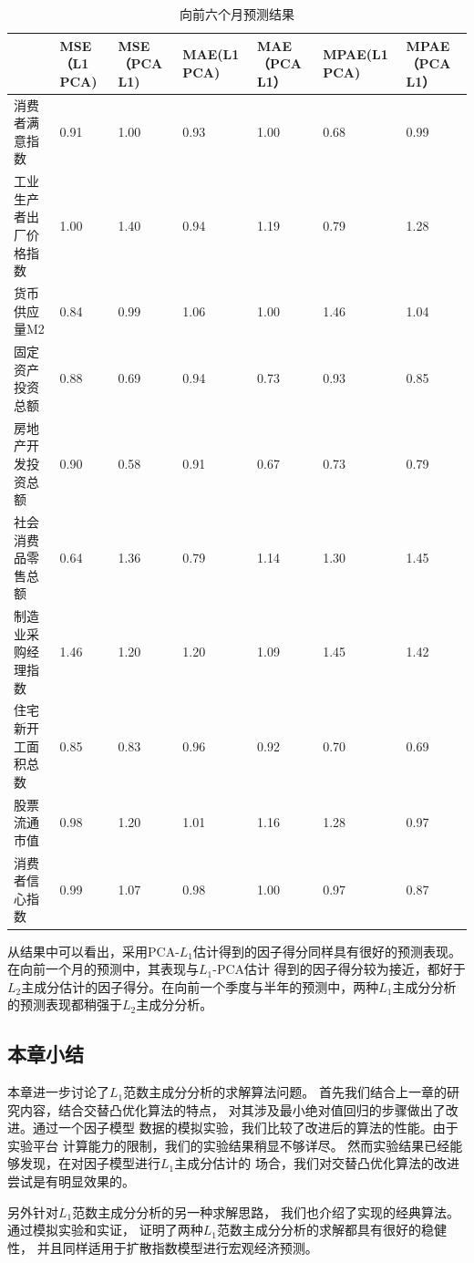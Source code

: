 \begin{table}[H]\label{outcome3}
    \centering
    \small
    \caption{向前六个月预测结果}
    \label{outcome6}
    \begin{tabularx}{\textwidth}{lXXXXXX}
    \toprule
                 &  MSE（L1 PCA) &  MSE（PCA L1) &  MAE(L1 PCA) &  MAE（PCA L1） &  MPAE(L1 PCA) &  MPAE（PCA L1） \\ \midrule
                 消费者满意指数     & 0.91            & 1.00        & 0.93            & 1.00        & 0.68             & 0.99         \\
    工业生产者出厂价格指数 & 1.00            & 1.40        & 0.94            & 1.19        & 0.79             & 1.28         \\
    货币供应量M2      & 0.84            & 0.99        & 1.06            & 1.00        & 1.46             & 1.04         \\
    固定资产投资总额  & 0.88            & 0.69        & 0.94            & 0.73        & 0.93             & 0.85         \\
    房地产开发投资总额 & 0.90            & 0.58       & 0.91            & 0.67        & 0.73             & 0.79        \\
    社会消费品零售总额 & 0.64            & 1.36        & 0.79            & 1.14        & 1.30             & 1.45         \\
    制造业采购经理指数   & 1.46            & 1.20        & 1.20            & 1.09        & 1.45             & 1.42         \\
    住宅新开工面积总数  & 0.85            & 0.83        & 0.96            & 0.92        & 0.70             & 0.69        \\
    股票流通市值   & 0.98            & 1.20        & 1.01            & 1.16        & 1.28             & 0.97         \\
    消费者信心指数     & 0.99            & 1.07        & 0.98            & 1.00        & 0.97             & 0.87         \\ \bottomrule
    \end{tabularx}
\end{table}

从结果中可以看出，采用PCA-$L_1$估计得到的因子得分同样具有很好的预测表现。在向前一个月的预测中，其表现与$L_1$-PCA估计
得到的因子得分较为接近，都好于$L_2$主成分估计的因子得分。在向前一个季度与半年的预测中，两种$L_1$主成分分析
的预测表现都稍强于$L_2$主成分分析。

\subsection{本章小结}
本章进一步讨论了$L_1$范数主成分分析的求解算法问题。
首先我们结合上一章的研究内容，结合交替凸优化算法的特点，
对其涉及最小绝对值回归的步骤做出了改进。通过一个因子模型
数据的模拟实验，我们比较了改进后的算法的性能。由于实验平台
计算能力的限制，我们的实验结果稍显不够详尽。
然而实验结果已经能够发现，在对因子模型进行$L_1$主成分估计的
场合，我们对交替凸优化算法的改进尝试是有明显效果的。

另外针对$L_1$范数主成分分析的另一种求解思路，
我们也介绍了实现的经典算法。通过模拟实验和实证，
证明了两种$L_1$范数主成分分析的求解都具有很好的稳健性，
并且同样适用于扩散指数模型进行宏观经济预测。

